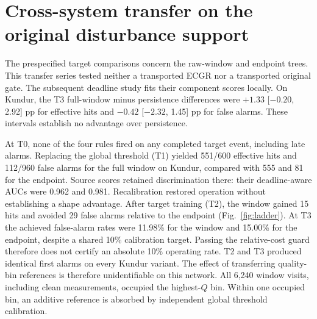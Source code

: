\documentclass[10pt]{article}
\begin{document}
\section{Cross-system transfer on the original disturbance support}
The prespecified target comparisons concern the raw-window and endpoint trees. This transfer series tested neither a transported ECGR nor a transported original gate. The subsequent deadline study fits their component scores locally. On Kundur, the T3 full-window minus persistence differences were $+1.33$ [$-0.20$, 2.92] pp for effective hits and $-0.42$ [$-2.32$, 1.45] pp for false alarms. These intervals establish no advantage over persistence.

At T0, none of the four rules fired on any completed target event, including late alarms. Replacing the global threshold (T1) yielded 551/600 effective hits and 112/960 false alarms for the full window on Kundur, compared with 555 and 81 for the endpoint. Source scores retained discrimination there: their deadline-aware AUCs were 0.962 and 0.981. Recalibration restored operation without establishing a shape advantage. After target training (T2), the window gained 15 hits and avoided 29 false alarms relative to the endpoint (Fig.~\ref{fig:ladder}). At T3 the achieved false-alarm rates were 11.98\% for the window and 15.00\% for the endpoint, despite a shared 10\% calibration target. Passing the relative-cost guard therefore does not certify an absolute 10\% operating rate. T2 and T3 produced identical first alarms on every Kundur variant. The effect of transferring quality-bin references is therefore unidentifiable on this network. All 6,240 window visits, including clean measurements, occupied the highest-$Q$ bin. Within one occupied bin, an additive reference is absorbed by independent global threshold calibration.
\end{document}
